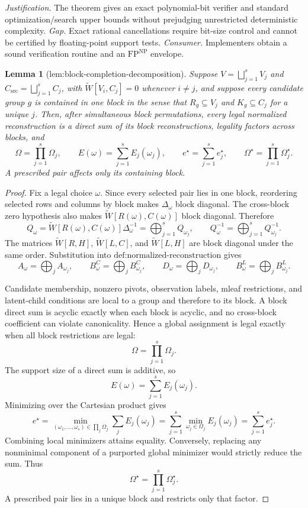 \documentclass{article}
\newtheorem{lemma}{Lemma}
\begin{document}
\par\smallskip\noindent \textit{Justification.} The theorem gives an exact polynomial-bit verifier and standard optimization/search upper bounds without prejudging unrestricted deterministic complexity. \textit{Gap.} Exact rational cancellations require bit-size control and cannot be certified by floating-point support tests. \textit{Consumer.} Implementers obtain a sound verification routine and an \(\mathrm{FP}^{\mathrm{NP}}\) envelope.

\begin{lemma}[lem:block-completion-decomposition]\label{lem:block-completion-decomposition}
Suppose \(V=\bigsqcup_{j=1}^sV_j\) and \(C_{\mathrm{src}}=\bigsqcup_{j=1}^sC_j\), with \(\widetilde W[V_i,C_j]=0\) whenever \(i\ne j\), and suppose every candidate group \(g\) is contained in one block in the sense that \(R_g\subseteq V_j\) and \(K_g\subseteq C_j\) for a unique \(j\).  Then, after simultaneous block permutations, every legal normalized reconstruction is a direct sum of its block reconstructions, legality factors across blocks, and
\[
\Omega=\prod_{j=1}^s\Omega_j,
\qquad
E(\omega)=\sum_{j=1}^sE_j(\omega_j),
\qquad
e^\star=\sum_{j=1}^se_j^\star,
\qquad
\Omega^\star=\prod_{j=1}^s\Omega_j^\star.
\]
A prescribed pair affects only its containing block.
\end{lemma}
\begin{proof}
Fix a legal choice \(\omega\). Since every selected pair lies in one block, reordering selected rows and columns by block makes \(\Delta_\omega\) block diagonal. The cross-block zero hypothesis also makes \(\widetilde W[R(\omega),C(\omega)]\) block diagonal. Therefore
\[
Q_\omega
=\widetilde W[R(\omega),C(\omega)]\Delta_\omega^{-1}
=\bigoplus_{j=1}^{s}Q_{\omega_j},
\qquad
Q_\omega^{-1}=\bigoplus_{j=1}^{s}Q_{\omega_j}^{-1}.
\]
The matrices \(\widetilde W[R,H]\), \(\widetilde W[L,C]\), and \(\widetilde W[L,H]\) are block diagonal under the same order. Substitution into \(\text{def:normalized-reconstruction}\) gives
\[
A_\omega=\bigoplus_jA_{\omega_j},\qquad
B^C_\omega=\bigoplus_jB^C_{\omega_j},\qquad
D_\omega=\bigoplus_jD_{\omega_j},\qquad
B^L_\omega=\bigoplus_jB^L_{\omega_j}.
\]

Candidate membership, nonzero pivots, observation labels, mleaf restrictions, and latent-child conditions are local to a group and therefore to its block. A block direct sum is acyclic exactly when each block is acyclic, and no cross-block coefficient can violate canonicality. Hence a global assignment is legal exactly when all block restrictions are legal:
\[
\Omega=\prod_{j=1}^{s}\Omega_j.
\]
The support size of a direct sum is additive, so
\[
E(\omega)=\sum_{j=1}^{s}E_j(\omega_j).
\]
Minimizing over the Cartesian product gives
\[
e^\star
=\min_{(\omega_1,\ldots,\omega_s)\in\prod_j\Omega_j}\sum_jE_j(\omega_j)
=\sum_{j=1}^{s}\min_{\omega_j\in\Omega_j}E_j(\omega_j)
=\sum_{j=1}^{s}e_j^\star.
\]
Combining local minimizers attains equality. Conversely, replacing any nonminimal component of a purported global minimizer would strictly reduce the sum. Thus
\[
\Omega^\star=\prod_{j=1}^{s}\Omega_j^\star.
\]
A prescribed pair lies in a unique block and restricts only that factor.
\end{proof}
\end{document}
